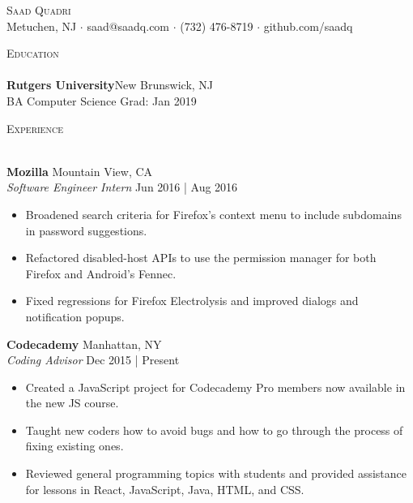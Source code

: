 \documentclass[a4paper]{article}
\newcommand{\lineunder} {
    \vspace*{-8pt} \\
    \hspace*{-18pt} \hrulefill \\
}
\newcommand{\header} [1] {
    {\hspace*{-18pt}\vspace*{6pt} \textsc{#1}}
    \vspace*{-6pt} \lineunder
}
\begin{document}
\vspace*{-40pt}

\vspace*{-10pt}
\begin{center}
	{\Huge \scshape {Saad Quadri}}\\
	Metuchen, NJ $\cdot$ saad@saadq.com $\cdot$ (732) 476-8719 $\cdot$ github.com/saadq\\
\end{center}

\vspace*{2mm}

\header{Education}
\textbf{Rutgers University}\hfill New Brunswick, NJ\\
BA Computer Science \hfill Grad: Jan 2019\\
\vspace{2mm}

\vspace*{2mm}

\header{Experience}
\vspace{1mm}

\textbf{Mozilla} \hfill Mountain View, CA\\
\textit{Software Engineer Intern} \hfill Jun 2016 | Aug 2016\\
\vspace{-1mm}
\begin{itemize} \itemsep 1pt
	\item Broadened search criteria for Firefox’s context menu to include subdomains in password suggestions.
	\item Refactored disabled-host APIs to use the permission manager for both Firefox and Android’s Fennec.
	\item Fixed regressions for Firefox Electrolysis and improved dialogs and notification popups.
\end{itemize}

\textbf{Codecademy} \hfill Manhattan, NY\\
\textit{Coding Advisor} \hfill Dec 2015 | Present\\
\vspace{-1mm}
\begin{itemize} \itemsep 1pt
	\item Created a JavaScript project for Codecademy Pro members now available in the new JS course.
	\item Taught new coders how to avoid bugs and how to go through the process of fixing existing ones.
	\item Reviewed general programming topics with students and provided assistance for lessons in React, JavaScript, Java, HTML, and CSS.
\end{itemize}
\end{document}

